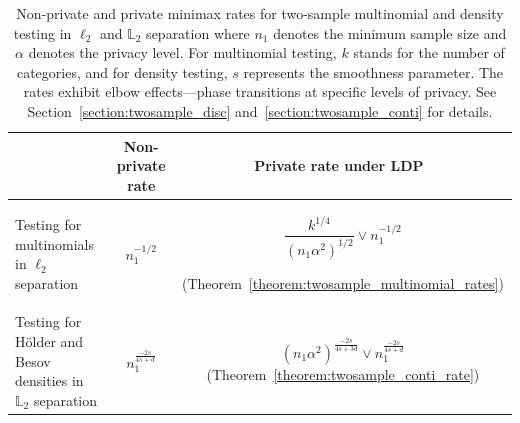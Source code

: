 \documentclass[twoside,11pt]{article}
\newcommand{\dimDensity}{d} %
\newcommand{\alphabetSize}{k} %
\newcommand{\sampleSize}{n}
\newcommand{\smoothness}{s}
\newcommand{\privacyParameter}{\alpha} %
\begin{document}
\begin{table}
	\small
	\begin{center}
		\begin{tabular}{lcc}
			\toprule
			&Non-private rate & Private rate under LDP\ \\
			\midrule
			\rule{0pt}{15pt}
			\makecell{Testing for multinomials \\ in $\ell_2$ separation}
			&
			\makecell{$\sampleSize_1^{-1/2}$
				\\
				\citep{chan2014optimal,kim_minimax_2022}
			}
			&
			\makecell{$
				\dfrac{\alphabetSize^{1/4}}{{(\sampleSize_1 \privacyParameter^2)^{1/2}}}
				\vee
				\sampleSize_1^{-1/2}
				$
				\\
				(Theorem~\ref{theorem:twosample_multinomial_rates})
			}
			\\
			\rule{0pt}{25pt}
			\makecell{
				Testing for H\"{o}lder and Besov \\densities in $\mathbb{L}_2$ separation}
			&%
			\makecell{ $\sampleSize_1^{\frac{-2s}{4\smoothness+\dimDensity}}$\\ \citep{Arias-Castro2018RememberDimension}
			}
			&%
			\makecell{$(\sampleSize_1\privacyParameter^2)^{\frac{-2s}{4\smoothness+3\dimDensity}} 
				\vee
				\sampleSize_1^{\frac{-2s}{4\smoothness+\dimDensity}}$
				\\(Theorem~\ref{theorem:twosample_conti_rate})
			}
			\\
			\bottomrule
		\end{tabular}
	\end{center}
				\caption{Non-private and private minimax rates for two-sample multinomial and density testing in $\ell_2$ and $\mathbb{L}_2$ separation where $\sampleSize_1$ denotes the minimum sample size and $\privacyParameter$ denotes the privacy level. For multinomial testing, $\alphabetSize$ stands for the number of categories, and for density testing, $\smoothness$ represents the smoothness parameter.
		The rates exhibit elbow effects{---}phase transitions at specific levels of privacy.
		See Section~\ref{section:twosample_disc} and~\ref{section:twosample_conti} for details.
	}\label{table:rates}
\end{table}
%
\end{document}
